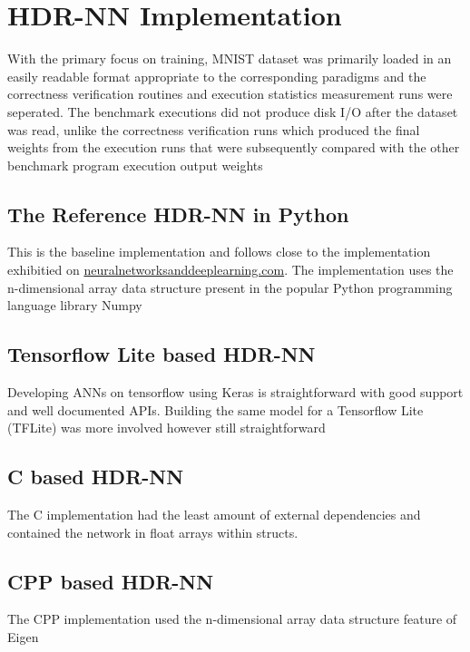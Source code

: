 \section{HDR-NN Implementation}

With the primary focus on training, MNIST dataset was primarily loaded in an easily readable format appropriate to the corresponding paradigms and the correctness verification routines and execution statistics measurement runs were seperated. The benchmark executions did not produce disk I/O after the dataset was read, unlike the correctness verification runs which produced the final weights from the execution runs that were subsequently compared with the other benchmark program execution output weights

\subsection[Python - Numpy]{The Reference HDR-NN in Python}

This is the baseline implementation and follows close to the implementation exhibitied on \href{http://neuralnetworksanddeeplearning.com}{neuralnetworksanddeeplearning.com}. The implementation uses the n-dimensional array data structure present in the popular Python programming language library Numpy

\subsection[Tensorflow Lite]{Tensorflow Lite based HDR-NN}

Developing ANNs on tensorflow using Keras is straightforward with good support and well documented APIs. Building the same model for a Tensorflow Lite (TFLite) was more involved however still straightforward

\subsection[C]{C based HDR-NN}

The C implementation had the least amount of external dependencies and contained the network in float arrays within structs.

\subsection[CPP - Eigen]{CPP based HDR-NN}

The CPP implementation used the n-dimensional array data structure feature of Eigen
